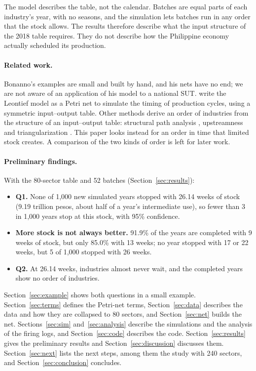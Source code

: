 \documentclass[11pt]{article}
\begin{document}
The model describes the table, not the calendar. Batches are equal parts of each industry's year, with no seasons, and the simulation lets batches run in any order that the stock allows. The results therefore describe what the input structure of the 2018 table requires. They do not describe how the Philippine economy actually scheduled its production.

\paragraph{Related work.} Bonanno's examples are small and built by hand, and his nets have no end; we are not aware of an application of his model to a national SUT. \citet{MolinaGutierrez2015} write the Leontief model as a Petri net to simulate the timing of production cycles, using a symmetric input--output table. Other methods derive an order of industries from the structure of an input--output table: structural path analysis \citep{DefournyThorbecke1984}, upstreamness \citep{Antras2012} and triangularization \citep{Fukui1986}. This paper looks instead for an order in time that limited stock creates. A comparison of the two kinds of order is left for later work.

\paragraph{Preliminary findings.} With the 80-sector table and 52 batches (Section~\ref{sec:results}):
\begin{itemize}[leftmargin=*]
\item \textbf{Q1.} None of 1{,}000 new simulated years stopped with 26.14 weeks of stock (9.19 trillion pesos, about half of a year's intermediate use), so fewer than 3 in 1{,}000 years stop at this stock, with 95\% confidence.
\item \textbf{More stock is not always better.} 91.9\% of the years are completed with 9 weeks of stock, but only 85.0\% with 13 weeks; no year stopped with 17 or 22 weeks, but 5 of 1{,}000 stopped with 26 weeks.
\item \textbf{Q2.} At 26.14 weeks, industries almost never wait, and the completed years show no order of industries.
\end{itemize}

Section~\ref{sec:example} shows both questions in a small example. Section~\ref{sec:terms} defines the Petri-net terms, Section~\ref{sec:data} describes the data and how they are collapsed to 80 sectors, and Section~\ref{sec:net} builds the net. Sections~\ref{sec:sim} and~\ref{sec:analysis} describe the simulations and the analysis of the firing logs, and Section~\ref{sec:code} describes the code. Section~\ref{sec:results} gives the preliminary results and Section~\ref{sec:discussion} discusses them. Section~\ref{sec:next} lists the next steps, among them the study with 240 sectors, and Section~\ref{sec:conclusion} concludes.
\end{document}
